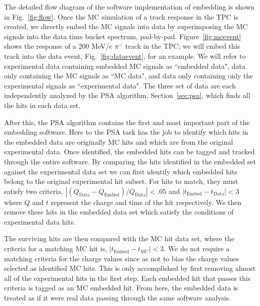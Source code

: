 The detailed flow diagram of the software implementation of embedding is shown in Fig.~\ref{fig:flow}. Once the MC simulation of a track response in the TPC is created, we directly embed the MC signals into data by superimposing the MC signals into the data time bucket spectrum, pad-by-pad. Figure~\ref{fig:mcevent} shows the response of a 200 MeV/c $\pi^-$ track in the TPC; we will embed this track into the data event, Fig.~\ref{fig:dataevent}, for an example. We will refer to experimental data containing embedded MC signals as ``embedded data", data only containing the MC signals as ``MC data", and data only containing only the experimental signals as ``experimental data". The three set of data are each independently analyzed by the PSA algorithm, Section~\ref{sec:psa},  which finds all the hits in each data set. 

After this, the PSA algorithm contains the first and most important part of the embedding software. Here to the PSA task has the job to identify which hits in the embedded data are originally MC hits and which are from the original experimental data. Once identified, the embedded hits can be tagged and tracked through the entire software. By comparing the hits identified in the embedded set against the experimental data set we can first identify which embedded hits belong to the original experimental hit subset. For hits to match, they must satisfy two criteria, $\left|(Q_{\mathrm{Data}} - Q_{\mathrm{Embed} })/Q_{\mathrm{Data}}\right| < .05$ and $\left|t_{\mathrm{Embed} } - t_{\mathrm{Data} }\right| < 3$ where $Q$ and $t$ represent the charge and time of the hit respectively. We then remove these hits in the embedded data set which satisfy the conditions of experimental data hits. 

The surviving hits are then compared with the MC hit data set, where the criteria for a matching MC hit is, $\left|t_{\mathrm{Embed} } - t_{\mathrm{MC} }\right| < 3$.  We do not require a matching criteria for the charge values since as not to bias the charge values selected as identified MC hits.  This is only accomplished by first removing almost all of the experimental hits in the first step. Each embedded hit that passes this criteria is tagged as an MC embedded hit. From here, the embedded data is treated as if it were real data passing through the same software analysis. 

